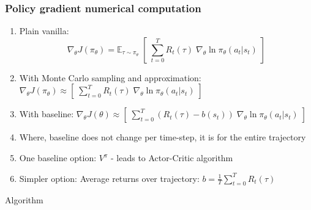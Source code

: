 \documentclass[a4paper, 12pt]{article}
\begin{document}
\subsubsection{Policy gradient numerical computation}

\begin{enumerate}
	\item Plain vanilla: 
	\begin{equation}
		\nabla_ \theta J(\pi_\theta) = \mathbb{E}_{\tau \sim \pi_\theta} \; [ \; \sum_{t=0}^T R_t(\tau) \; \nabla_\theta \ln \pi_\theta(a_t \vert s_t) \;]
	\end{equation}
	\item With Monte Carlo sampling and approximation: $\nabla_\theta J(\pi_\theta) \approx [ \; \sum_{t=0}^T R_t(\tau) \; \nabla_\theta \ln \pi_\theta(a_t \vert s_t) \;]$
	\item With baseline: $\nabla_\theta J(\theta) \approx [ \; \sum_{t=0}^T (R_t(\tau) - b(s_t)) \; \nabla_\theta \ln \pi_\theta(a_t \vert s_t) \;]$
	\item Where, baseline does not change per time-step, it is for the entire trajectory
	\item One baseline option: $V^\pi$ - leads to Actor-Critic algorithm
	\item Simpler option: Average returns over trajectory: $b = \frac{1}{T}\sum_{t=0}^T R_t(\tau) $
\end{enumerate}

Algorithm
%
\end{document}
